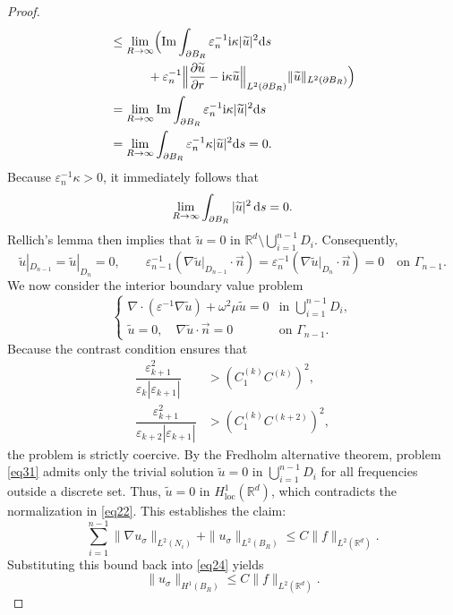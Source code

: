 \documentclass[12pt,reqno]{amsart}
\numberwithin{equation}{section}
\begin{document}
\begin{proof}
\begin{equation}
\begin{aligned}
&\le\lim_{R\to\infty}\Bigl(\operatorname{Im}\int_{\partial B_R}\varepsilon_n^{-1}{\rm i}\kappa|\widetilde{u}|^2{\rm d}s \\
&\qquad\quad+\varepsilon_n^{-1}\Bigl\|\frac{\partial\widetilde{u}}{\partial r}-{\rm i}\kappa\widetilde{u}\Bigr\|_{L^2(\partial B_R)}\|\widetilde{u}\|_{L^2(\partial B_R)}\Bigr)\\
&=\lim_{R\to\infty}\operatorname{Im}\int_{\partial B_R}\varepsilon_n^{-1}{\rm i}\kappa|\widetilde{u}|^2{\rm d}s\\
&=\lim_{R\to\infty}\int_{\partial B_R}\varepsilon_n^{-1}\kappa|\widetilde{u}|^2{\rm d}s=0.
\end{aligned}
\end{equation}		
Because $\varepsilon_n^{-1} \kappa > 0$, it immediately follows that
\begin{equation*}
    \lim_{R\to\infty} \int_{\partial B_R} |\widetilde{u}|^2 \, {\rm d}s = 0.
\end{equation*}
Rellich's lemma  \cite[Lemma 2.12]{MR2986407} then implies that $\widetilde{u} = 0$ in $\mathbb{R}^d \setminus \bigcup_{i=1}^{n-1} D_i$. Consequently,
\begin{equation*}
    \widetilde{u}|_{D_{n-1}} = \widetilde{u}|_{D_n} = 0, \qquad
    \varepsilon_{n-1}^{-1}(\nabla\widetilde{u}|_{D_{n-1}}\cdot\vec{n})=\varepsilon_n^{-1}(\nabla\widetilde{u}|_{D_n}\cdot\vec{n})=0
    \quad\text{on }\Gamma_{n-1}.
\end{equation*}
We now consider the interior boundary value problem
\begin{equation}\label{eq31}
    \begin{cases}
        \nabla \cdot (\varepsilon^{-1} \nabla \widetilde{u}) + \omega^2 \mu \widetilde{u} = 0 & \text{in } \bigcup_{i=1}^{n-1} D_i, \\
        \widetilde{u} = 0, \quad \nabla\widetilde{u}\cdot\vec{n} = 0 & \text{on } \Gamma_{n-1}.
    \end{cases}
\end{equation}
Because the contrast condition ensures that
\begin{align*}
\dfrac{\varepsilon_{k+1}^2}{\varepsilon_k|\varepsilon_{k+1}|}
&> (C_1^{(k)} C^{(k)})^2, \\
\dfrac{\varepsilon_{k+1}^2}{\varepsilon_{k+2}|\varepsilon_{k+1}|}
&> (C_1^{(k)} C^{(k+2)})^2,
\end{align*}
the problem is strictly coercive. By the Fredholm alternative theorem, problem \eqref{eq31} admits only the trivial solution $\widetilde{u} = 0$ in $\bigcup_{i=1}^{n-1} D_i$ for all frequencies outside a discrete set. Thus, $\widetilde{u} = 0$ in $H^1_{\mathrm{loc}}(\mathbb{R}^d)$, which contradicts the normalization in \eqref{eq22}. This establishes the claim:
\begin{equation*}
    \sum_{i=1}^{n-1} \|\nabla u_\sigma\|_{L^2(N_i)} + \|u_\sigma\|_{L^2(B_R)} \le C \|f\|_{L^2(\mathbb{R}^d)}.
\end{equation*}
Substituting this bound back into \eqref{eq24} yields
\begin{equation*}
    \|u_\sigma\|_{H^1(B_R)} \le C \|f\|_{L^2(\mathbb{R}^d)}.
\end{equation*}


\end{proof}
\end{document}
